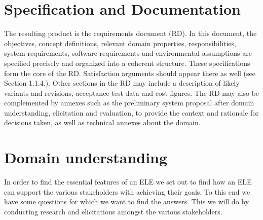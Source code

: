 \chapter{Specification and Documentation}
The resulting product is the requirements document (RD). In this document, the objectives,
concept definitions, relevant domain properties, responsibilities, system requirements, software
requirements and environmental assumptions are specified precisely and organized into a
coherent structure. These specifications form the core of the RD. Satisfaction arguments should
appear there as well (see Section 1.1.4.). Other sections in the RD may include a description
of likely variants and revisions, acceptance test data and cost figures. The RD may also be
complemented by annexes such as the preliminary system proposal after domain understanding,
elicitation and evaluation, to provide the context and rationale for decisions taken, as well as
technical annexes about the domain. 


\chapter{Domain understanding}
\label{ch:understanding} 
In order to find the essential features of an ELE we set out to find how an ELE can support the various stakeholders with achieving their goals. To this end we have some questions for which we want to find the answers. This we will do by conducting research and elicitations amongst the various stakeholders.


